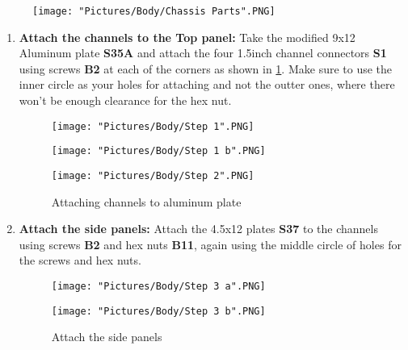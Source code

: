 \documentclass[12pt]{article}
\begin{document}
\begin{figure}[H]
	\centering
	\texttt{[image: "Pictures/Body/Chassis Parts".PNG]}
\end{figure}

\begin{enumerate}
\item \textbf{Attach the channels to the Top panel: } Take the modified 9x12 Aluminum plate \textbf{S35A} and attach the four 1.5inch channel connectors \textbf{S1} using screws \textbf{B2} at each of the corners as shown in \ref{channel to al plate}. Make sure to use the inner circle as your holes for attaching and not the outter ones, where there won't be enough clearance for the hex nut. 

\begin{figure}[H]
  	\centering
  	\begin{minipage}[b]{0.20\textwidth}
    		\texttt{[image: "Pictures/Body/Step 1".PNG]}
  	\end{minipage}
  	\hfill
  	\begin{minipage}[b]{0.30\textwidth}
    		\texttt{[image: "Pictures/Body/Step 1 b".PNG]}
  	\end{minipage}
    	\hfill
  	\begin{minipage}[b]{0.40\textwidth}
    		\texttt{[image: "Pictures/Body/Step 2".PNG]}
  	\end{minipage}
  	\caption{Attaching channels to aluminum plate}
	\label{channel to al plate}
\end{figure}

\item \textbf{Attach the side panels: } Attach the 4.5x12 plates \textbf{S37} to the channels using screws \textbf{B2} and hex nuts \textbf{B11}, again using the middle circle of holes for the screws and hex nuts. 

\begin{figure}[H]
 	\centering
 	\begin{minipage}[b]{0.45\textwidth}
    		\texttt{[image: "Pictures/Body/Step 3 a".PNG]}
  	\end{minipage}
  	\hfill
  	\begin{minipage}[b]{0.45\textwidth}
    		\texttt{[image: "Pictures/Body/Step 3 b".PNG]}
  	\end{minipage}
  	\caption{Attach the side panels}
	\label{Body side panels}
\end{figure}


\end{enumerate}
\end{document}
